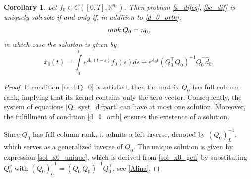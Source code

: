 \documentclass[preprint,12pt]{elsarticle}
\numberwithin{equation}{section}
\newtheorem{corollary}[theorem]{Corollary}
\theoremstyle{definition}
\begin{document}
\begin{corollary}\label{corollary_ODEpart_uniqueness}
  Let $f_0\in C([0,T],\mathbb{R}^{n_0})$. Then problem \eqref{x_difeq}, \eqref{bc_dif} is uniquely solvable if and only if, in addition to \eqref{d_0_orth},
\begin{equation}\label{rankQ_0}
    \emph{rank}~Q_0=n_0,
\end{equation}
in which case the solution is given by
\begin{equation}\label{sol_x0_unique}
    x_0(t)=\int\limits_0^t e^{A_0(t-s)}f_0(s)ds+e^{A_0t}(Q_0^\top Q_0)^{-1}Q_0^\top\widehat{d}_0.
\end{equation}
\end{corollary}
\begin{proof}
If condition \eqref{rankQ_0} is satisfied, then the matrix $Q_0$ has full column rank, implying that its kernel contains only the zero vector. Consequently, the system of equations  \eqref{Q_syst_difpart} can have at most one solution. Moreover, the fulfillment of condition \eqref{d_0_orth} ensures the existence of a solution.

Since $Q_0$ has full column rank, it admits a left inverse, denoted by $(Q_0)_L^{-1}$, which serves as a generalized inverse of  $Q_0$.
The unique solution is given by expression \eqref{sol_x0_unique}, which is derived from \eqref{sol_x0_gen} by substituting $Q_0^g$ with
$(Q_0)_L^{-1}=(Q_0^\top Q_0)^{-1}Q_0^\top$, see
\eqref{Alina}.
\end{proof}
\end{document}
